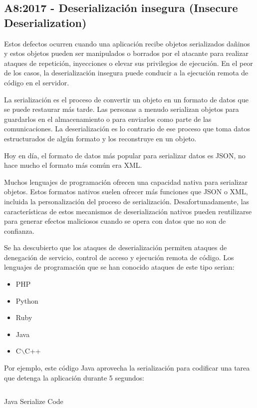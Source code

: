 \newpage
\subsection{A8:2017 - Deserialización insegura (Insecure Deserialization) }

Estos defectos ocurren cuando una aplicación recibe objetos serializados dañinos y estos objetos
pueden ser manipulados o borrados por el atacante para realizar ataques de repetición,
inyecciones o elevar sus privilegios de ejecución. En el peor de los casos, la deserialización
insegura puede conducir a la ejecución remota de código en el servidor. 

La serialización es el proceso de convertir un objeto en un formato de datos que se puede restaurar 
más tarde. Las personas a menudo serializan objetos para guardarlos en el almacenamiento o para enviarlos 
como parte de las comunicaciones. La deserialización es lo contrario de ese proceso que toma datos
estructurados de algún formato y los reconstruye en un objeto.

Hoy en día, el formato de datos más popular para serializar datos es JSON, no hace mucho el 
formato más común era XML.

Muchos lenguajes de programación ofrecen una capacidad nativa para serializar objetos. Estos formatos 
nativos suelen ofrecer más funciones que JSON o XML, incluida la personalización del proceso de 
serialización. Desafortunadamente, las características de estos mecanismos de deserialización 
nativos pueden reutilizarse para generar efectos maliciosos cuando se opera con datos que no son de confianza.

Se ha descubierto que los ataques de deserialización permiten ataques de denegación de servicio, control 
de acceso y ejecución remota de código. Los lenguajes de programación que se han conocido ataques de este 
tipo serian:

\begin{itemize}
    \item PHP
    \item Python
    \item Ruby
    \item Java
    \item C$\backslash$C++
\end{itemize}

Por ejemplo, este código Java aprovecha la serialización para codificar una tarea que detenga 
la aplicación durante 5 segundos:

\begin{listing}[!htb]
    \inputminted{java}{./Ficheros/Serialize.java}
    \caption{Java Serialize Code}
    \label{listing:2}
\end{listing}

